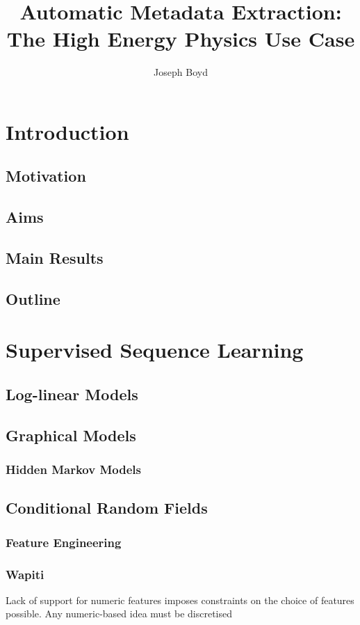 \documentclass[10pt, oneside]{scrartcl}   	%
\title{Automatic Metadata Extraction: The High Energy Physics Use Case}
\author{Joseph Boyd}
\begin{document}
\maketitle

\tableofcontents

\section{Introduction} %

\subsection{Motivation}
\subsection{Aims}
\subsection{Main Results}
\subsection{Outline}
\section{Supervised Sequence Learning}
\subsection{Log-linear Models}
\subsection{Graphical Models}
\subsubsection{Hidden Markov Models}
\subsection{Conditional Random Fields}
\subsubsection{Feature Engineering}
\subsubsection{Wapiti}
Lack of support for numeric features imposes constraints on the choice of features possible. Any numeric-based idea must be discretised
\end{document}
